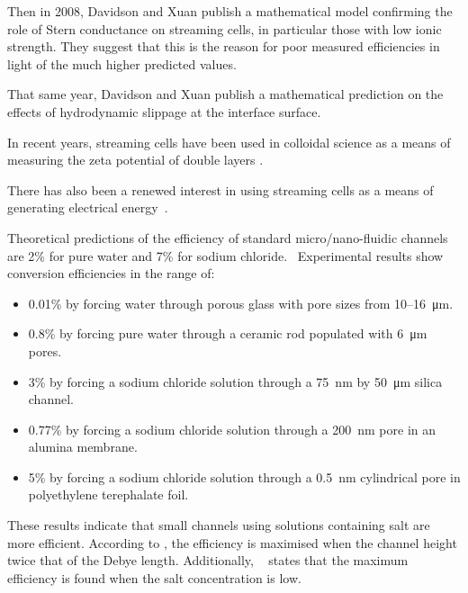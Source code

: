     Then in 2008, Davidson and Xuan publish a mathematical model confirming the role of Stern conductance on streaming cells, in particular those with low ionic strength\cite{Davidson2008}.
    They suggest that this is the reason for poor measured efficiencies in light of the much higher predicted values.

    That same year, Davidson and Xuan publish a mathematical prediction on the effects of hydrodynamic slippage at the interface surface.




    In recent years, streaming cells have been used in colloidal science as a means of measuring the zeta potential of double layers \cite{Gu2000,Scales1992,Daiguji2004,VanderHeyden2006,Mala1997}.

    There has also been a renewed interest in using streaming cells as a means of generating electrical energy~\cite{Chang2009,Daiguji2006,Daiguji2004b,Davidson2008a,Davidson2008,CherngHon2012,Jiao2014,Lu2006,Olthuis2005,Pennathur2007,Ren2008a,VanderHeyden2006,Heyden2007,Xie2008,Yang2003}.

    Theoretical predictions of the efficiency of standard micro/nano-fluidic channels are 2\% for pure water and 7\% for sodium chloride.~\cite{VanderHeyden2006}
    Experimental results show conversion efficiencies in the range of:
    \begin{itemize}
        \item 0.01\% by forcing water through porous glass with pore sizes from 10\thinspace--\SI{16}{\micro\metre}.~\cite{Yang2003}
        \item 0.8\% by forcing pure water through a ceramic rod populated with \SI{6}{\micro\metre} pores.~\cite{Yang2004}
        \item 3\% by forcing a sodium chloride solution through a \SI{75}{\nano\metre} by \SI{50}{\micro\metre} silica channel.~\cite{Heyden2007}
        \item 0.77\% by forcing a sodium chloride solution through a \SI{200}{\nano\metre} pore in an alumina membrane.~\cite{Lu2006}
        \item 5\% by forcing a sodium chloride solution through a \SI{0.5}{\nano\metre} cylindrical pore in polyethylene terephalate foil.~\cite{Xie2008}
    \end{itemize}

    These results indicate that small channels using solutions containing salt are more efficient.
    According to \cite{Daiguji2004b}, the efficiency is maximised when the channel height twice that of the Debye length.
    Additionally, ~\cite{VanderHeyden2006} states that the maximum efficiency is found when the salt concentration is low.

